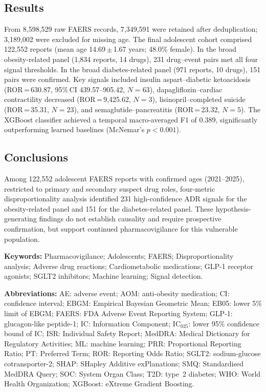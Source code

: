 \documentclass[10pt,a4paper]{article}
\begin{document}
\subsection*{Results}
From 8,598,529 raw FAERS records, 7,349,591 were retained after deduplication; 3,189,002 were excluded for missing age. The final adolescent cohort comprised 122,552 reports (mean age 14.69\,$\pm$\,1.67 years; 48.0\% female). In the broad obesity-related panel (1,834 reports, 14 drugs), 231 drug--event pairs met all four signal thresholds. In the broad diabetes-related panel (971 reports, 10 drugs), 151 pairs were confirmed. Key signals included insulin aspart--diabetic ketoacidosis (ROR\,=\,630.87, 95\%\,CI 439.57--905.42, $N=63$), dapagliflozin--cardiac contractility decreased (ROR\,=\,9{,}425.62, $N=3$), lisinopril--completed suicide (ROR\,=\,35.31, $N=23$), and semaglutide--pancreatitis (ROR\,=\,23.32, $N=5$). The XGBoost classifier achieved a temporal macro-averaged F1 of 0.389, significantly outperforming learned baselines (McNemar's $p{<}0.001$).

\subsection*{Conclusions}
Among 122,552 adolescent FAERS reports with confirmed ages (2021--2025), restricted to primary and secondary suspect drug roles, four-metric disproportionality analysis identified 231 high-confidence ADR signals for the obesity-related panel and 151 for the diabetes-related panel. These hypothesis-generating findings do not establish causality and require prospective confirmation, but support continued pharmacovigilance for this vulnerable population.

\vspace{8pt}
\noindent\textbf{Keywords:} Pharmacovigilance; Adolescents; FAERS; Disproportionality analysis; Adverse drug reactions; Cardiometabolic medications; GLP-1 receptor agonists; SGLT2 inhibitors; Machine learning; Signal detection.

\vspace{6pt}
\noindent\textbf{Abbreviations:} AE: adverse event; AOM: anti-obesity medication; CI: confidence interval; EBGM: Empirical Bayesian Geometric Mean; EB05: lower 5\% limit of EBGM; FAERS: FDA Adverse Event Reporting System; GLP-1: glucagon-like peptide-1; IC: Information Component; IC$_{025}$: lower 95\% confidence bound of IC; ISR: Individual Safety Report; MedDRA: Medical Dictionary for Regulatory Activities; ML: machine learning; PRR: Proportional Reporting Ratio; PT: Preferred Term; ROR: Reporting Odds Ratio; SGLT2: sodium-glucose cotransporter-2; SHAP: SHapley Additive exPlanations; SMQ: Standardised MedDRA Query; SOC: System Organ Class; T2D: type~2 diabetes; WHO: World Health Organization; XGBoost: eXtreme Gradient Boosting.
\end{document}
